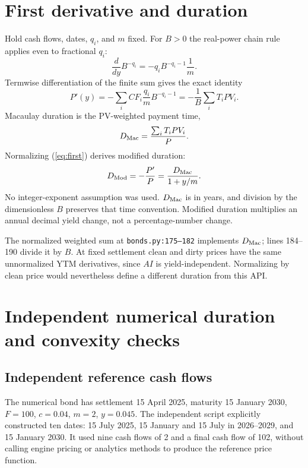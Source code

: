 \documentclass[12pt,a4paper]{article}
\begin{document}
\section{First derivative and duration}
Hold cash flows, dates, $q_i$, and $m$ fixed. For $B>0$ the real-power
chain rule applies even to fractional $q_i$:
\[
 \frac{d}{dy}B^{-q_i}=-q_i B^{-q_i-1}\frac1m.
\]
Termwise differentiation of the finite sum gives the exact identity
\begin{equation}\label{eq:first}
 P'(y)=-\sum_i CF_i\frac{q_i}{m}B^{-q_i-1}
       =-\frac1B\sum_i T_iPV_i.
\end{equation}
Macaulay duration is the PV-weighted payment time,
\[
 D_{\rm Mac}=\frac{\sum_i T_iPV_i}{P}.
\]
Normalizing (\ref{eq:first}) derives modified duration:
\begin{equation}\label{eq:mod}
 D_{\rm Mod}=-\frac{P'}P=\frac{D_{\rm Mac}}{1+y/m}.
\end{equation}
No integer-exponent assumption was used. $D_{\rm Mac}$ is in years, and
division by the dimensionless $B$ preserves that time convention.
Modified duration multiplies an annual decimal yield change, not a
percentage-number change.

The normalized weighted sum at \texttt{bonds.py:175--182} implements
$D_{\rm Mac}$; lines 184--190 divide it by $B$.
At fixed settlement clean and dirty prices have the same unnormalized
YTM derivatives, since $AI$ is yield-independent. Normalizing by clean
price would nevertheless define a different duration from this API.

\section{Independent numerical duration and convexity checks}
\subsection{Independent reference cash flows}
The numerical bond has settlement 15 April 2025, maturity 15 January 2030,
$F=100$, $c=0.04$, $m=2$, $y=0.045$.
The independent script explicitly constructed ten dates: 15 July 2025,
15 January and 15 July in 2026--2029, and 15 January 2030.
It used nine cash flows of 2 and a final cash flow of 102, without calling
engine pricing or analytics methods to produce the reference price function.
\end{document}
